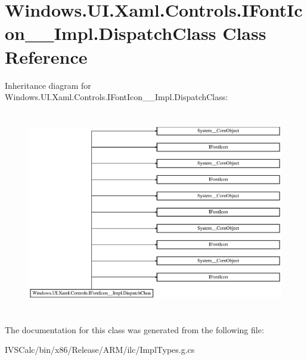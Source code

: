 \hypertarget{class_windows_1_1_u_i_1_1_xaml_1_1_controls_1_1_i_font_icon_____impl_1_1_dispatch_class}{}\section{Windows.\+U\+I.\+Xaml.\+Controls.\+I\+Font\+Icon\+\_\+\+\_\+\+Impl.\+Dispatch\+Class Class Reference}
\label{class_windows_1_1_u_i_1_1_xaml_1_1_controls_1_1_i_font_icon_____impl_1_1_dispatch_class}
Inheritance diagram for Windows.\+U\+I.\+Xaml.\+Controls.\+I\+Font\+Icon\+\_\+\+\_\+\+Impl.\+Dispatch\+Class\+:\begin{figure}[H]
\begin{center}
\leavevmode
\includegraphics[height=8.953488cm]{class_windows_1_1_u_i_1_1_xaml_1_1_controls_1_1_i_font_icon_____impl_1_1_dispatch_class}
\end{center}
\end{figure}


The documentation for this class was generated from the following file\+:\begin{DoxyCompactItemize}
\item 
I\+V\+S\+Calc/bin/x86/\+Release/\+A\+R\+M/ilc/Impl\+Types.\+g.\+cs\end{DoxyCompactItemize}
